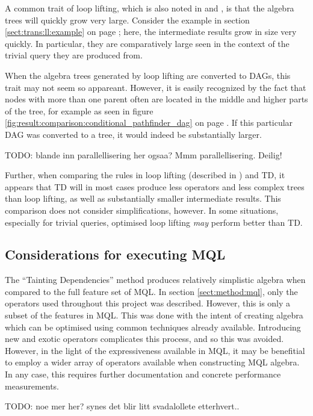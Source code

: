 A common trait of loop lifting, which is also noted in
\cite{pathfinder_mothertongue} and \cite{pathfinder_purelyRelational}, is that
the algebra trees will quickly grow very large. Consider the example in section 
\ref{sect:trans:ll:example} on page \pageref{sect:trans:ll:example}; here, the
intermediate results grow in size very quickly. In particular, they are
comparatively large seen in the context of the trivial query they are produced
from.

When the algebra trees generated by loop lifting are converted to DAGs, this
trait may not seem so appareant. However, it is easily recognized by the fact
that nodes with more than one parent often are located in the middle and higher
parts of the tree, for example as seen in figure
\ref{fig:result:comparison:conditional_pathfinder_dag} on page
\pageref{fig:result:comparison:conditional_pathfinder_dag}. If this particular
DAG was converted to a tree, it would indeed be substantially larger.

TODO: blande inn parallellisering her ogsaa? Mmm parallellisering. Deilig!

Further, when comparing the rules in loop lifting (described in
\cite{pathfinder_mothertongue}) and TD, it appears that TD will in most cases
produce less operators and less complex trees than loop lifting, as well as
substantially smaller intermediate results. This comparison does not consider
simplifications, however. In some situations, especially for trivial queries,
optimised loop lifting \emph{may} perform better than TD. 

\subsection{Considerations for executing MQL}
The ``Tainting Dependencies'' method produces relatively simplistic algebra
when compared to the full feature set of MQL. In section \ref{sect:method:mql},
only the operators used throughout this project was described. However, this is
only a subset of the features in MQL. This was done with the intent of creating
algebra which can be optimised using common techniques already available.
Introducing new and exotic operators complicates this process, and so this was
avoided. However, in the light of the expressiveness available in MQL, it may
be benefitial to employ a wider array of operators available when constructing
MQL algebra. In any case, this requires further documentation and concrete
performance measurements.

TODO: noe mer her? synes det blir litt svadalollete etterhvert.. 